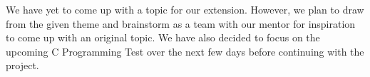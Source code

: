 \documentclass[11pt]{article}
\begin{document}
\begin{flushleft}
We have yet to come up with a topic for our extension. However, we plan to draw from the given theme and brainstorm as a team with our mentor for inspiration to come up with an original topic. We have also decided to focus on the upcoming C Programming Test over the next few days before continuing with the project.  
\end{flushleft}
\end{document}
